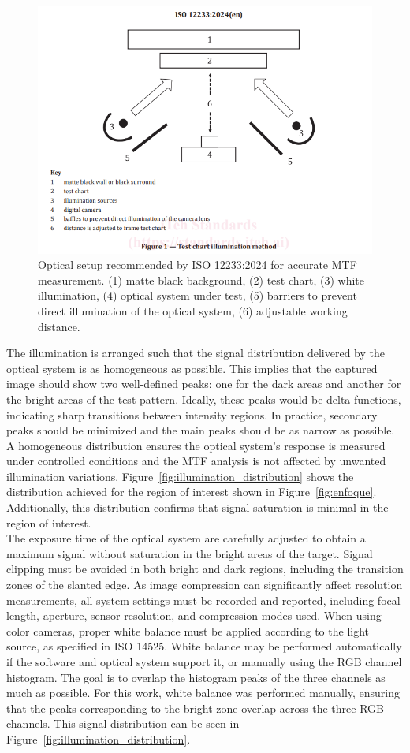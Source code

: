 \begin{figure}[H]
    \centering
    \includegraphics[trim=20mm 50mm 20mm 0mm, clip, width=0.7\linewidth]{Figures/C3/iso 12233 montaje.png}
    \caption{Optical setup recommended by ISO 12233:2024 for accurate MTF measurement. (1) matte black background, (2) test chart, (3) white illumination, (4) optical system under test, (5) barriers to prevent direct illumination of the optical system, (6) adjustable working distance.}
    \label{fig:srf_motaje}
\end{figure}

\noindent The illumination is arranged such that the signal distribution delivered by the optical system is as homogeneous as possible. This implies that the captured image should show two well-defined peaks: one for the dark areas and another for the bright areas of the test pattern. Ideally, these peaks would be delta functions, indicating sharp transitions between intensity regions. In practice, secondary peaks should be minimized and the main peaks should be as narrow as possible. A homogeneous distribution ensures the optical system’s response is measured under controlled conditions and the MTF analysis is not affected by unwanted illumination variations. Figure~\ref{fig:illumination_distribution} shows the distribution achieved for the region of interest shown in Figure~\ref{fig:enfoque}. Additionally, this distribution confirms that signal saturation is minimal in the region of interest.\\

\noindent The exposure time of the optical system are carefully adjusted to obtain a maximum signal without saturation in the bright areas of the target. Signal clipping must be avoided in both bright and dark regions, including the transition zones of the slanted edge. As image compression can significantly affect resolution measurements, all system settings must be recorded and reported, including focal length, aperture, sensor resolution, and compression modes used. When using color cameras, proper white balance must be applied according to the light source, as specified in ISO 14525. White balance may be performed automatically if the software and optical system support it, or manually using the RGB channel histogram. The goal is to overlap the histogram peaks of the three channels as much as possible. For this work, white balance was performed manually, ensuring that the peaks corresponding to the bright zone overlap across the three RGB channels. This signal distribution can be seen in Figure~\ref{fig:illumination_distribution}.\\

